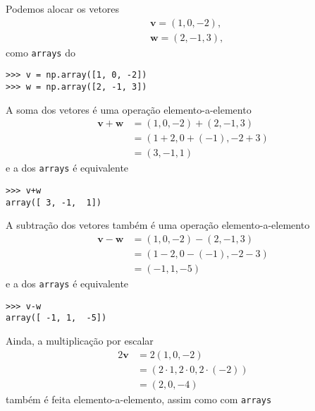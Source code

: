 \begin{ex}
  Podemos alocar os vetores
  \begin{align}
    &\pmb{v} = (1, 0, -2),\\
    &\pmb{w} = (2, -1, 3),
  \end{align}
  como \lstinline+arrays+ do {\numpy}

\begin{lstlisting}
>>> v = np.array([1, 0, -2])
>>> w = np.array([2, -1, 3])
\end{lstlisting}

  A soma dos vetores é uma operação elemento-a-elemento
  \begin{subequations}
    \begin{align}
      \pmb{v}+\pmb{w} &= (1, 0, -2) + (2, -1, 3)\\
                      &= \left(1+2, 0+(-1), -2+3\right)\\
                      &= (3, -1, 1)
    \end{align}
  \end{subequations}
  e a dos \lstinline+arrays+ é equivalente

\begin{lstlisting}
>>> v+w
array([ 3, -1,  1])
\end{lstlisting}

  A subtração dos vetores também é uma operação elemento-a-elemento
  \begin{subequations}
    \begin{align}
      \pmb{v}-\pmb{w} &= (1, 0, -2) - (2, -1, 3)\\
                      &= \left(1-2, 0-(-1), -2-3\right)\\
                      &= (-1, 1, -5)
    \end{align}
  \end{subequations}
  e a dos \lstinline+arrays+ é equivalente

\begin{lstlisting}
>>> v-w
array([ -1, 1,  -5])
\end{lstlisting}

  Ainda, a multiplicação por escalar
  \begin{subequations}
    \begin{align}
      2\pmb{v} &= 2(1, 0, -2)\\
               &= \left(2\cdot 1, 2\cdot 0, 2\cdot(-2)\right)\\
               &= (2, 0, -4)
    \end{align}
  \end{subequations}
  também é feita elemento-a-elemento, assim como com \lstinline+arrays+


\end{ex}
